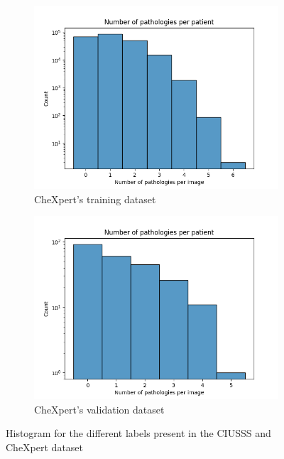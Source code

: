 \documentclass[11pt]{article}
\begin{document}
\begin{figure}[H]
     \begin{subfigure}[b]{0.45\linewidth}
         \centering
         \includegraphics[width=\linewidth]{plots/disease_count_chexpert_train}
         \caption{CheXpert's training dataset}
         \vspace{4ex}
         \label{fig:count_chexpert_train}
     \end{subfigure}
     \hfill
     \begin{subfigure}[b]{0.45\linewidth}
         \centering
         \includegraphics[width=\linewidth]{plots/disease_count_chexpert_valid}
         \caption{CheXpert's validation dataset}
         \vspace{4ex}
         \label{fig:count_chexpert_valid}
     \end{subfigure}
     \label{fig:classes_per_image}
     \caption{Histogram for the different labels present in the CIUSSS and CheXpert dataset}

\end{figure}
    
\end{document}
